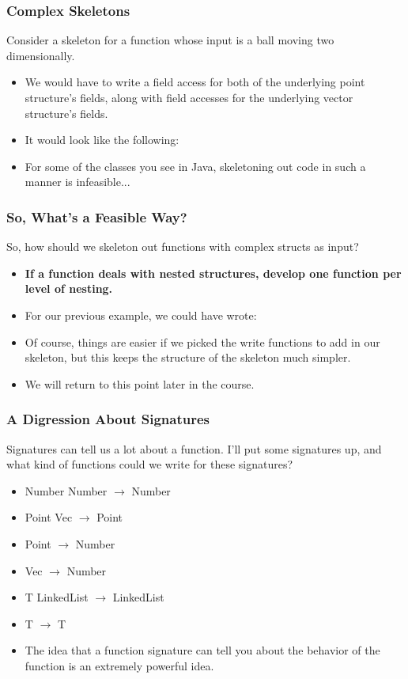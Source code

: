 \documentclass{beamer}
\begin{document}

\begin{frame}
  \frametitle{Complex Skeletons}
 Consider a skeleton for a function whose input
 is a ball moving two dimensionally.
 \begin{itemize}
 \item<2-> We would have to write a field access for both of the
   underlying point structure's fields, along with field accesses for the underlying vector structure's fields. 
 \item<3-> It would look like the following:
   \ComplexSkeleton
 \item<4-> For some of the classes you see in Java, skeletoning
   out code in such a manner is infeasible...   
 \end{itemize}  
\end{frame}

\begin{frame}
  \frametitle{So, What's a Feasible Way?}
  So, how should we skeleton out functions with complex structs
  as input?
  \begin{itemize}
  \item<2-> \textbf{If a function deals with nested structures, develop one function per level of nesting.}
  \item<3-> For our previous example, we could have wrote:
    \SimplerSkeleton
  \item<4-> Of course, things are easier if we picked the write functions to add in our skeleton, but this keeps the structure of
    the skeleton much simpler.
  \item<5-> We will return to this point later in the course.    
  \end{itemize}   
\end{frame}

\begin{frame}
  \frametitle{A Digression About Signatures}
  Signatures can tell us a lot about a function. I'll put
  some signatures up, and what kind of functions could we write
  for these signatures?
  \begin{itemize}
  \item<1-> Number Number $\rightarrow$ Number
  \item<2-> Point Vec $\rightarrow$ Point
  \item<3-> Point $\rightarrow$ Number
  \item<4-> Vec $\rightarrow$ Number
  \item<5-> T LinkedList $\rightarrow$ LinkedList
  \item<6-> T $\rightarrow$ T
  \item<7-> The idea that a function signature can tell you
    about the behavior of the function is an extremely powerful idea.
  \end{itemize}
\end{frame}
\end{document}

